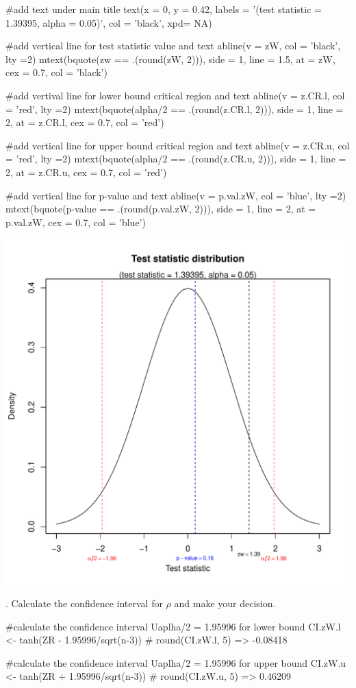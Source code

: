\documentclass[12pt, oneside]{report}\usepackage[]{graphicx}\usepackage[]{color}
\makeatletter
\def\maxwidth{ %
  \ifdim\Gin@nat@width>\linewidth
    \linewidth
  \else
    \Gin@nat@width
  \fi
}
\makeatother
\begin{document}
\begin{Schunk}
\begin{Sinput}
#add text under main title
text(x = 0, y = 0.42, labels = '(test statistic = 1.39395, alpha = 0.05)', col = 'black', xpd= NA)

#add vertical line for test statistic value and text
abline(v = zW, col = 'black', lty =2)
mtext(bquote(zw == .(round(zW, 2))), side = 1, line = 1.5,
      at = zW, cex = 0.7, col = 'black')

#add vertival line for lower bound critical region and text
abline(v = z.CR.l, col = 'red', lty =2)
mtext(bquote(alpha/2 == .(round(z.CR.l, 2))), side = 1, line = 2,
      at = z.CR.l, cex = 0.7, col = 'red')

#add vertical line for upper bound critical region and text
abline(v = z.CR.u, col = 'red', lty =2)
mtext(bquote(alpha/2 == .(round(z.CR.u, 2))), side = 1, line = 2,
      at = z.CR.u, cex = 0.7, col = 'red')

#add vertical line for p-value and text
abline(v = p.val.zW, col = 'blue', lty =2)
mtext(bquote(p-value == .(round(p.val.zW, 2))), side = 1, line = 2,
      at = p.val.zW, cex = 0.7, col = 'blue')
\end{Sinput}

\includegraphics[width=\maxwidth]{figure/unnamed-chunk-7-2} \end{Schunk}

. Calculate the confidence interval for $\rho$ and make your decision.
\begin{Schunk}
\begin{Sinput}
#calculate the confidence interval Uaplha/2 = 1.95996 for lower bound
CI.zW.l <- tanh(ZR - 1.95996/sqrt(n-3))
# round(CI.zW.l, 5) => -0.08418

#calculate the confidence interval Uaplha/2 = 1.95996 for upper bound
CI.zW.u <- tanh(ZR + 1.95996/sqrt(n-3))
# round(CI.zW.u, 5) => 0.46209
\end{Sinput}
\end{Schunk}
\end{document}
